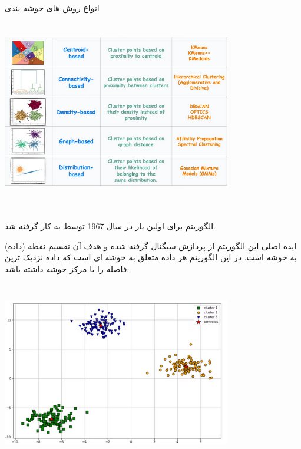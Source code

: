 \documentclass[10pt]{beamer}
\begin{document}
\begin{frame}{انواع روش های خوشه بندی}
	\begin{center}
		\includegraphics[height=8cm, width=10cm]{types_of_clustering}
	\end{center}
\end{frame}

\begin{frame}{}
	\section{}
الگوریتم  برای اولین بار در سال 1967 توسط  به کار گرفته شد.

ایده اصلی این الگوریتم از پردازش سیگنال گرفته شده و هدف آن تقسیم  نقطه (داده) به  خوشه است. در این الگوریتم هر داده متعلق به خوشه ای است که داده نزدیک ترین فاصله را با مرکز خوشه داشته باشد.
\end{frame}	

\begin{frame}{}
\includegraphics[height=8cm, width=10cm]{clustering}
\end{frame}
\end{document}

